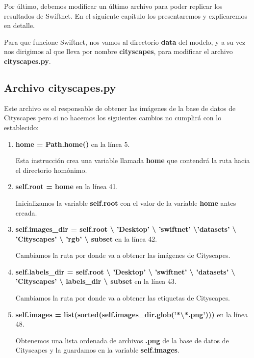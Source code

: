Por último, debemos modificar un último archivo para poder replicar los resultados de Swiftnet. En el siguiente capítulo los presentaremos y explicaremos en detalle.

Para que funcione Swiftnet, nos vamos al directorio \textbf{data} del modelo, y a su vez nos dirigimos al que lleva por nombre \textbf{cityscapes}, para modificar el archivo \textbf{cityscapes.py}.

\subsection{Archivo cityscapes.py}

Este archivo es el responsable de obtener las imágenes de la base de datos de Cityscapes pero si no hacemos los siguientes cambios no cumplirá con lo establecido:

\begin{enumerate}
\item \textbf{home = Path.home()} en la línea 5.

Esta instrucción crea una variable llamada \textbf{home} que contendrá la ruta hacia el directorio homónimo.

\item \textbf{self.root = home} en la línea 41.

Inicializamos la variable \textbf{self.root} con el valor de la variable \textbf{home} antes creada.

\item \textbf{self.images\_dir = self.root \textbackslash{} 'Desktop' \textbackslash{} 'swiftnet' \textbackslash{}'datasets' \textbackslash{} 'Cityscapes' \textbackslash{} 'rgb' \textbackslash{} subset} en la línea 42.

Cambiamos la ruta por donde va a obtener las imágenes de Cityscapes.

\item \textbf{self.labels\_dir = self.root \textbackslash{} 'Desktop' \textbackslash{} 'swiftnet' \textbackslash{} 'datasets' \textbackslash{} 'Cityscapes' \textbackslash{} labels\_dir \textbackslash{} subset} en la línea 43.

Cambiamos la ruta por donde va a obtener las etiquetas de Cityscapes.

\item \textbf{self.images = list(sorted(self.images\_dir.glob('*\textbackslash{*.png}')))} en la línea 48.

Obtenemos una lista ordenada de archivos \textbf{.png} de la base de datos de Cityscapes y la guardamos en la variable \textbf{self.images}.
\end{enumerate}

